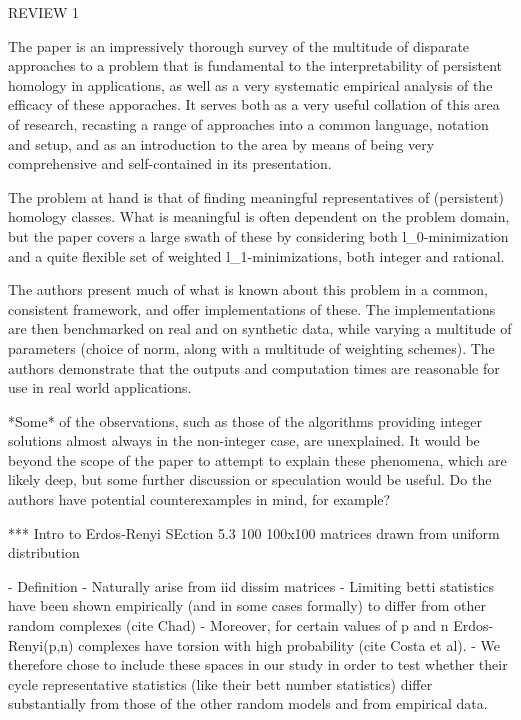 \documentclass{article}
\begin{document}
REVIEW 1

The paper is an impressively thorough survey of the multitude of disparate approaches to a problem that is fundamental to the
interpretability of persistent homology in applications, as well as a very systematic empirical analysis of the efficacy of these apporaches. It serves both as a very useful collation of this area of research, recasting a range of approaches into a common language, notation and setup, and as an introduction to the area by means of being very comprehensive and self-contained in its presentation.

The problem at hand is that of finding meaningful representatives of (persistent) homology classes. What is meaningful is often dependent on the problem domain, but the paper covers a large swath of these by considering both l_0-minimization and a quite flexible set of weighted l_1-minimizations, both integer and rational.

The authors present much of what is known about this problem in a common, consistent framework, and offer implementations of these. The implementations are then benchmarked on real and on synthetic data, while varying a multitude of parameters (choice of norm, along with a multitude of weighting schemes). The authors demonstrate that the outputs and computation times are reasonable for use in real world applications.

*Some* of the observations, such as those of the algorithms providing integer solutions almost always in the non-integer case, are unexplained. It would be beyond the scope of the paper to attempt to explain these phenomena, which are likely deep, but some further discussion or speculation would be useful. Do the authors have potential counterexamples in mind, for example?

    *** Intro to Erdos-Renyi SEction 5.3 100 100x100 matrices drawn from uniform distribution
    
    - Definition
    - Naturally arise from iid dissim matrices
    - Limiting betti statistics have been shown empirically (and in some cases formally) to differ from other random complexes (cite Chad)
    - Moreover, for certain values of p and n Erdos-Renyi(p,n) complexes have torsion with high probability (cite Costa et al). 
    - We therefore chose to include these spaces in our study in order to test whether their cycle representative statistics (like their bett number statistics) differ substantially from those of the other random models and from empirical data.  
    
\end{document}
